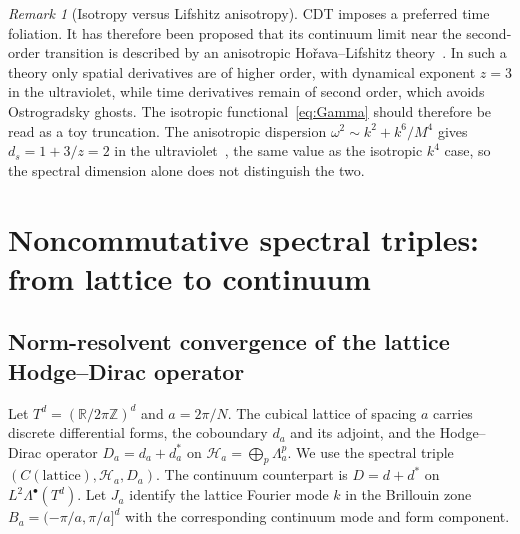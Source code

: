 \documentclass[11pt]{article}
\theoremstyle{remark}\newtheorem*{remark}{Remark}
\newcommand{\ZZ}{\mathbb{Z}}
\newcommand{\RR}{\mathbb{R}}
\begin{document}
\begin{remark}[Isotropy versus Lifshitz anisotropy]
CDT imposes a preferred time foliation. It has therefore been proposed that its continuum limit near the
second-order transition is described by an anisotropic Ho\v{r}ava--Lifshitz theory~\cite{Horava,AGJJL}. In such a
theory only spatial derivatives are of higher order, with dynamical exponent $z=3$ in the ultraviolet, while
time derivatives remain of second order, which avoids Ostrogradsky ghosts. The isotropic
functional~\eqref{eq:Gamma} should therefore be read as a toy truncation. The anisotropic dispersion
$\omega^2\sim k^2+k^6/M^4$ gives $d_s=1+3/z=2$ in the ultraviolet~\cite{Horava}, the same value as the isotropic $k^4$
case, so the spectral dimension alone does not distinguish the two.
\end{remark}

\section{Noncommutative spectral triples: from lattice to continuum}
\label{sec:ncg}

\subsection{Norm-resolvent convergence of the lattice Hodge--Dirac operator}
Let $T^d=(\RR/2\pi\ZZ)^d$ and $a=2\pi/N$. The cubical lattice of spacing $a$ carries discrete differential forms,
the coboundary $d_a$ and its adjoint, and the Hodge--Dirac operator $D_a=d_a+d_a^*$ on
$\mathcal H_a=\bigoplus_p\Lambda^p_a$. We use the spectral triple $(C(\text{lattice}),\mathcal H_a,D_a)$. The continuum
counterpart is $D=d+d^*$ on $L^2\Lambda^\bullet(T^d)$. Let $J_a$ identify the lattice Fourier mode $k$ in the Brillouin
zone $B_a=(-\pi/a,\pi/a]^d$ with the corresponding continuum mode and form component.
\end{document}
